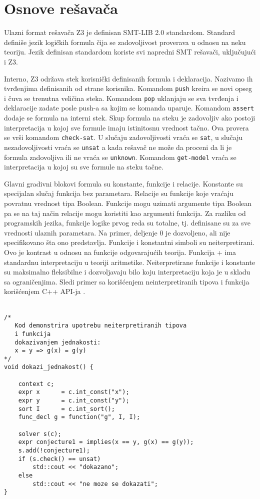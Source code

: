 \documentclass[12pt,oneside]{memoir}
\begin{document}
\section{Osnove rešavača}  \label{sec:num1}
Ulazni format rešavača Z3 je definisan SMT-LIB 2.0 standardom. Standard definiše jezik logičkih formula čija se zadovoljivost proverava u odnosu na neku teoriju. Jezik definisan standardom koriste svi napredni SMT rešavači, uključujući i Z3. 
\par
Interno, Z3 održava stek korisnički definisanih formula i deklaracija. Nazivamo ih tvrđenjima definisanih od strane korisnika. Komandom \texttt{push} kreira se novi opseg i čuva se trenutna veličina steka. Komandom \texttt{pop} uklanjaju se sva tvrđenja i deklaracije zadate posle push-a sa kojim se komanda uparuje. Komandom \texttt{assert} dodaje se formula na interni stek. Skup formula na steku je zadovoljiv ako postoji interpretacija u kojoj sve formule imaju istinitosnu vrednost tačno. Ova provera se vrši komandom \texttt{check-sat}. U slučaju zadovoljivosti vraća se \texttt{sat}, u slučaju nezadovoljivosti vraća se \texttt{unsat} a kada rešavač ne može da proceni da li je formula zadovoljiva ili ne vraća se \texttt{unknown}. Komandom \texttt{get-model} vraća se interpretacija u kojoj su sve formule na steku tačne. 
\par
Glavni gradivni blokovi formula su konstante, funkcije i relacije. Konstante su specijalan slučaj funkcija bez parametara. 
Relacije su funkcije koje vraćaju povratnu vrednost tipa Boolean. Funkcije mogu uzimati argumente tipa Boolean pa se na taj način relacije mogu koristiti kao argumenti funkcija. Za razliku od programskih jezika, funkcije logike prvog reda su totalne, tj. definisane su za sve vrednosti ulaznih parametara. Na primer, deljenje 0 je dozvoljeno, ali nije specifikovano šta ono predstavlja. Funkcije i konstantni simboli su neiterpretirani. Ovo je kontrast u odnosu na funkcije odgovarajućih teorija. Funkcija + ima standardnu interpretaciju u teoriji aritmetike. Neiterpretirane funkcije i konstante su maksimalno fleksibilne i dozvoljavaju bilo koju interpretaciju koja je u skladu sa ograničenjima. 
Sledi primer sa korišćenjem neinterpretiranih tipova i funkcija korišćenjem C++ API-ja . 
\\ \\
\begin{lstlisting}
/*
   Kod demonstrira upotrebu neiterpretiranih tipova
   i funkcija 
   dokazivanjem jednakosti:
   x = y => g(x) = g(y)
*/
void dokazi_jednakost() {
    
    context c;
    expr x      = c.int_const("x");
    expr y      = c.int_const("y");
    sort I      = c.int_sort();
    func_decl g = function("g", I, I);
    
    solver s(c);
    expr conjecture1 = implies(x == y, g(x) == g(y));
    s.add(!conjecture1);
    if (s.check() == unsat) 
        std::cout << "dokazano";
    else
        std::cout << "ne moze se dokazati";
}


\end{lstlisting}
\end{document}
